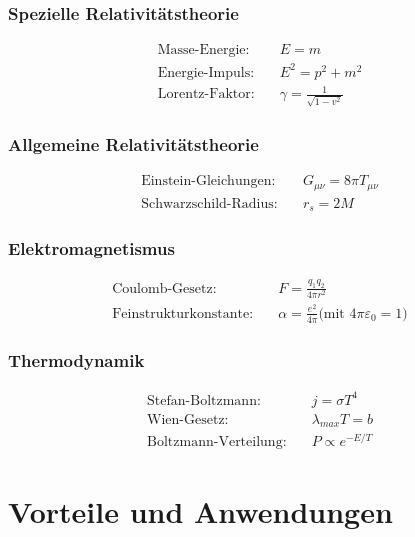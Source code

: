 \documentclass[11pt,a4paper]{article}
\begin{document}
	\subsubsection{Spezielle Relativitätstheorie}
	\begin{align}
		\text{Masse-Energie:} \quad & E = m \\
		\text{Energie-Impuls:} \quad & E^2 = p^2 + m^2 \\
		\text{Lorentz-Faktor:} \quad & \gamma = \frac{1}{\sqrt{1-v^2}}
	\end{align}
	
	\subsubsection{Allgemeine Relativitätstheorie}
	\begin{align}
		\text{Einstein-Gleichungen:} \quad & G_{\mu\nu} = 8\pi T_{\mu\nu} \\
		\text{Schwarzschild-Radius:} \quad & r_s = 2M
	\end{align}
	
	\subsubsection{Elektromagnetismus}
	\begin{align}
		\text{Coulomb-Gesetz:} \quad & F = \frac{q_1 q_2}{4\pi r^2} \\
		\text{Feinstrukturkonstante:} \quad & \alpha = \frac{e^2}{4\pi}
		\text{(mit } 4\pi\varepsilon_0 = 1\text{)}
	\end{align}
	
	\subsubsection{Thermodynamik}
	\begin{align}
		\text{Stefan-Boltzmann:} \quad & j = \sigma T^4 \\
		\text{Wien-Gesetz:} \quad & \lambda_{max} T = b \\
		\text{Boltzmann-Verteilung:} \quad & P \propto e^{-E/T}
	\end{align}
	
	\section{Vorteile und Anwendungen}
	
\end{document}

